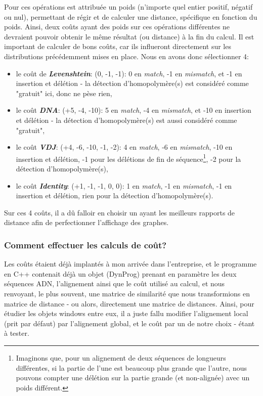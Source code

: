 \documentclass[12pt]{report}
\begin{document}
\begin{spacing}{1.2}
Pour ces opérations est attribuée un poids (n'importe quel entier positif, négatif ou nul), permettant de régir et de calculer une distance, spécifique en fonction du poids.
\newline
Ainsi, deux coûts ayant des poids sur ces opérations différentes ne devraient pouvoir obtenir le même résultat (ou distance) à la fin du calcul.
\newline
Il est important de calculer de bons coûts, car ils influeront directement sur les distributions précédemment mises en place. Nous en avons donc sélectionner 4:
\begin{itemize}
\item{le coût de \textbf{\textit{Levenshtein}}: (0, -1, -1): 0 en \textit{match}, -1 en \textit{mismatch}, et -1 en insertion et délétion - la détection d'homopolymère(s) est considéré comme "gratuit" ici, donc ne pèse rien,}
\item{le coût \textbf{\textit{DNA}}: (+5, -4, -10): 5 en \textit{match}, -4 en \textit{mismatch}, et -10 en insertion et délétion - la détection d'homopolymère(s) est aussi considéré comme "gratuit",}
\item{le coût \textbf{\textit{VDJ}}: (+4, -6, -10, -1, -2): 4 en \textit{match}, -6 en \textit{mismatch}, -10 en insertion et délétion, -1 pour les délétions de fin de séquence\footnote{Imaginons que, pour un alignement de deux séquences de longueurs différentes, si la partie de l'une est beaucoup plus grande que l'autre, nous pouvons compter une délétion sur la partie grande (et non-alignée) avec un poids différent.}, -2 pour la détection d'homopolymère(s),}
\item{le coût \textbf{\textit{Identity}}: (+1, -1, -1, 0, 0): 1 en \textit{match}, -1 en \textit{mismatch}, -1 en insertion et délétion, rien pour la détection d'homopolymère(s).}
\end{itemize}
Sur ces 4 coûts, il a dû falloir en choisir un ayant les meilleurs rapports de distance afin de perfectionner l'affichage des graphes.

\subsubsection{Comment effectuer les calculs de coût?}

Les coûts étaient déjà implantés à mon arrivée dans l'entreprise, et le programme en C++ contenait déjà un objet (DynProg) prenant en paramètre les deux séquences ADN, l'alignement ainsi que le coût utilisé au calcul, et nous renvoyant, le plus souvent, une matrice de similarité que nous transformions en matrice de distance - ou alors, directement une matrice de distances.
\newline
Ainsi, pour étudier les objets windows entre eux, il a juste fallu modifier l'alignement local (prit par défaut) par l'alignement global, et le coût par un de notre choix - étant à tester.


\end{spacing}
\end{document}
